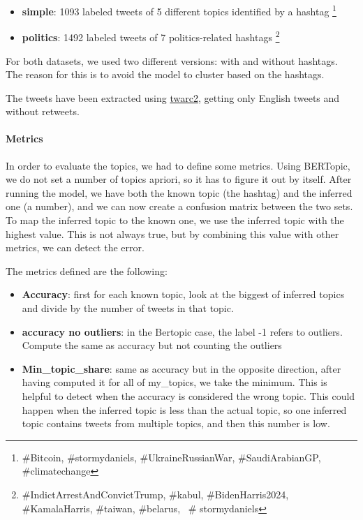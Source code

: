 \begin{itemize}
    \item \textbf{simple}: 1093 labeled tweets of 5 different topics identified by a hashtag \footnote{\#Bitcoin, \#stormydaniels, \#UkraineRussianWar, \#SaudiArabianGP, \#climatechange}
    \item \textbf{politics}: 1492 labeled tweets of 7 politics-related hashtags \footnote{\#IndictArrestAndConvictTrump, \#kabul, \#BidenHarris2024, \#KamalaHarris, \#taiwan, \#belarus,  \# stormydaniels}
\end{itemize}


For both datasets, we used two different versions: with and without hashtags. The reason for this is to avoid the model to cluster based on the hashtags.

The tweets have been extracted using \href{https://twarc-project.readthedocs.io/en/latest/twarc2_en_us/}{twarc2}, getting only English tweets and without retweets.

\paragraph{Metrics}
In order to evaluate the topics, we had to define some metrics. Using BERTopic, we do not set a number of topics apriori, so it has to figure it out by itself. After running the model, we have both the known topic (the hashtag) and the inferred one (a number), and we can now create a confusion matrix between the two sets. To map the inferred topic to the known one, we use the inferred topic with the highest value. This is not always true, but by combining this value with other metrics, we can detect the error.

The metrics defined are the following:

\begin{itemize}
    \item \textbf{Accuracy}: first 
    for each known topic, look at the biggest of inferred topics and divide by the number of tweets in that topic.
    \item \textbf{accuracy no outliers}: in the Bertopic case, the label -1 refers to outliers. Compute the same as accuracy but not counting the outliers
    \item \textbf{Min\_topic\_share}: same as accuracy but in the opposite direction, after having computed it for all of my\_topics, we take the minimum. This is helpful to detect when the accuracy is considered the wrong topic. This could happen when the inferred topic is less than the actual topic, so one inferred topic contains tweets from multiple topics, and then this number is low.
\end{itemize}


